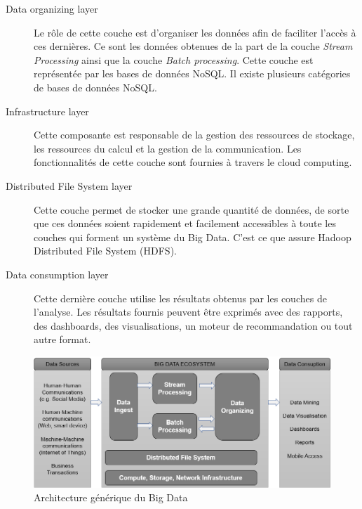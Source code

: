 \begin{description}
		
		\item[Data organizing layer] Le rôle de cette couche est d'organiser les données afin de faciliter l'accès à ces dernières. Ce sont les  données obtenues  de la part de la  couche  \textit{Stream Processing} ainsi que la couche \textit{Batch processing}. Cette couche est représentée par les bases de données NoSQL. Il existe plusieurs catégories de bases de données NoSQL.
		
		\item[Infrastructure layer] Cette composante est responsable de la gestion des ressources de stockage, les ressources du calcul et la gestion de la communication. 
		Les fonctionnalités de cette couche sont fournies à travers le cloud computing.
		
		\item[Distributed File System layer] Cette couche permet de stocker une grande quantité de données, de sorte que ces données soient rapidement et facilement accessibles à toute les couches qui forment un système du Big Data. C'est ce que assure Hadoop Distributed File System (HDFS).
		
		\item[Data consumption layer] Cette dernière couche utilise les résultats obtenus par les couches de l'analyse. Les résultats fournis peuvent être exprimés avec des rapports, des dashboards, des visualisations, un moteur de recommandation ou tout autre format.
		
	\end{description}
	
		\begin{figure}[H]
			\captionsetup{justification = centering}
			\centering
			\includegraphics[width=1\linewidth]{illustrations/bigdata-architecture}
			\caption{Architecture générique du Big Data \cite{anil-big-data}}
			\label{fig:bigdata-architecture}
			
		\end{figure}

